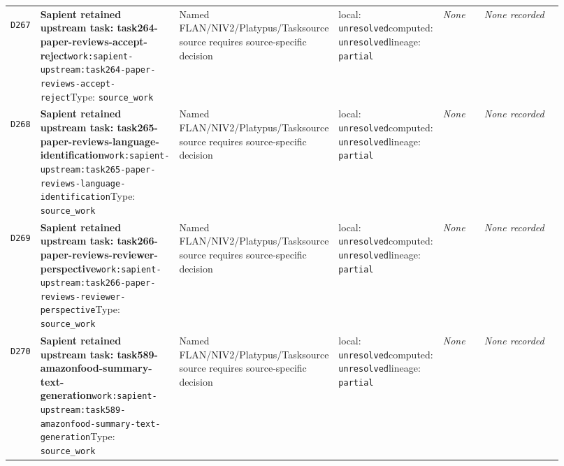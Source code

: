 \documentclass[9pt,a4paper]{article}
\newcommand{\depid}[1]{\hypertarget{dep:#1}{\texttt{#1}}}
\begin{document}
\begin{landscape}
\begin{longtable}{@{}L{0.035\linewidth}L{0.185\linewidth}L{0.27\linewidth}L{0.09\linewidth}L{0.10\linewidth}L{0.24\linewidth}@{}}
\depid{D267} & \textbf{Sapient retained upstream task: task264-paper-reviews-accept-reject}\newline \nolinkurl{work:sapient-upstream:task264-paper-reviews-accept-reject}\newline Type: \texttt{source\_work} & Named FLAN/NIV2/Platypus/Tasksource source requires source-specific decision & local: \texttt{unresolved}\newline computed: \texttt{unresolved}\newline lineage: \texttt{partial} & \textit{None} & \textit{None recorded} \\
\depid{D268} & \textbf{Sapient retained upstream task: task265-paper-reviews-language-identification}\newline \nolinkurl{work:sapient-upstream:task265-paper-reviews-language-identification}\newline Type: \texttt{source\_work} & Named FLAN/NIV2/Platypus/Tasksource source requires source-specific decision & local: \texttt{unresolved}\newline computed: \texttt{unresolved}\newline lineage: \texttt{partial} & \textit{None} & \textit{None recorded} \\
\depid{D269} & \textbf{Sapient retained upstream task: task266-paper-reviews-reviewer-perspective}\newline \nolinkurl{work:sapient-upstream:task266-paper-reviews-reviewer-perspective}\newline Type: \texttt{source\_work} & Named FLAN/NIV2/Platypus/Tasksource source requires source-specific decision & local: \texttt{unresolved}\newline computed: \texttt{unresolved}\newline lineage: \texttt{partial} & \textit{None} & \textit{None recorded} \\
\depid{D270} & \textbf{Sapient retained upstream task: task589-amazonfood-summary-text-generation}\newline \nolinkurl{work:sapient-upstream:task589-amazonfood-summary-text-generation}\newline Type: \texttt{source\_work} & Named FLAN/NIV2/Platypus/Tasksource source requires source-specific decision & local: \texttt{unresolved}\newline computed: \texttt{unresolved}\newline lineage: \texttt{partial} & \textit{None} & \textit{None recorded} \\

\end{longtable}
\end{landscape}
\end{document}
